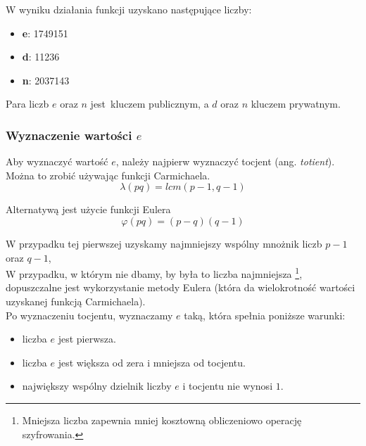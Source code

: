 \documentclass[12pt]{article}
\begin{document}
\newpage

W wyniku działania funkcji uzyskano następujące liczby:

\begin{itemize}
	\item \textbf{e}: 1749151
	\item \textbf{d}: 11236
	\item \textbf{n}: 2037143
\end{itemize}

Para liczb $e$ oraz $n$ jest kluczem publicznym, a $d$ oraz $n$ kluczem prywatnym.

\subsubsection{Wyznaczenie wartości $e$}

Aby wyznaczyć wartość $e$, należy najpierw wyznaczyć tocjent (ang. \textit{totient}).
\\

Można to zrobić używając funkcji Carmichaela.
\begin{equation}
	\lambda (pq) = lcm(p-1, q-1)
\end{equation}

Alternatywą jest użycie funkcji Eulera
\begin{equation}
	\varphi (pq) = (p-q)(q-1)
\end{equation}

W przypadku tej pierwszej uzyskamy
najmniejszy wspólny mnożnik liczb $p-1$ oraz $q-1$,
\\

W przypadku, w którym nie dbamy, by była to liczba najmniejsza
\footnote{Mniejsza liczba zapewnia mniej kosztowną obliczeniowo operację
szyfrowania.},
dopuszczalne jest wykorzystanie metody Eulera (która da wielokrotność
wartości uzyskanej funkcją Carmichaela).
\\

Po wyznaczeniu tocjentu, wyznaczamy $e$ taką, która spełnia poniższe warunki:

\begin{itemize}
	\item liczba $e$ jest pierwsza.
	\item liczba $e$ jest większa od zera i mniejsza od tocjentu.
	\item największy wspólny dzielnik liczby $e$ i tocjentu nie wynosi $1$.
\end{itemize}

\newpage
\end{document}
